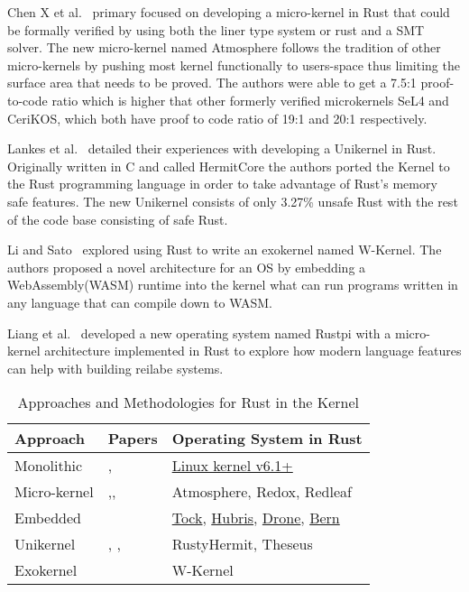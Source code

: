 \documentclass[sigconf]{acmart}
\begin{document}
Chen X et al.~\cite{Chen2023-wb} primary focused on developing a micro-kernel in Rust that could be formally verified by using both the liner type system or rust and a SMT solver. The new micro-kernel named Atmosphere follows the tradition of other micro-kernels by pushing most kernel functionally to users-space thus limiting the surface area that needs to be proved. The authors were able to get a 7.5:1 proof-to-code ratio which is higher that other formerly verified microkernels SeL4 and CeriKOS, which both have proof to code ratio of 19:1 and 20:1 respectively.

Lankes et al.~\cite{Lankes2019-cm} detailed their experiences with developing a Unikernel in Rust. Originally written in C and called HermitCore the authors ported the Kernel to the Rust programming language in order to take advantage of Rust's memory safe features. The new Unikernel consists of only 3.27\% unsafe Rust with the rest of the code base consisting of safe Rust.

Li and Sato~\cite{Li2024-yb} explored using Rust to write an exokernel named W-Kernel. The authors proposed a novel architecture for an OS by embedding a WebAssembly(WASM) runtime into the kernel what can run programs written in any language that can compile down to WASM.

Liang et al.~\cite{Liang2021-bo} developed a new operating system named Rustpi with a micro-kernel architecture implemented in Rust to explore how modern language features can help with building reilabe systems.

\begin{table}
    \begin{tabular}{||l|l|l||}
    \hline
    Approach & Papers & Operating System in Rust\\
    \hline\hline
    Monolithic  & \cite{The_kernel_development_community_undated-iw}, \cite{Li2019-ru} & \href{https://docs.kernel.org/rust/}{Linux kernel v6.1+}\\
    Micro-kernel & \cite{Chen2023-wb},\cite{Liang2021-bo}, \cite{Liu2024-xe} & Atmosphere, Redox, Redleaf\\
    Embedded & \cite{Culic2022-bk} & \href{https://github.com/tock/tock}{Tock}, \href{https://hubris.oxide.computer/}{Hubris}, \href{https://www.drone-os.com/}{Drone}, \href{https://bern-rtos.org/}{Bern} \\
    Unikernel & \cite{Lankes2019-cm},  \cite{Boos2020-zh}, \cite{Ijaz2023-da}  & RustyHermit, Theseus \\
    Exokernel & \cite{Li2024-yb} & W-Kernel \\
    \hline
  \end{tabular}
  \caption{Approaches and Methodologies for Rust in the Kernel}
    \label{tab:RQ1}
\end{table}
\end{document}
